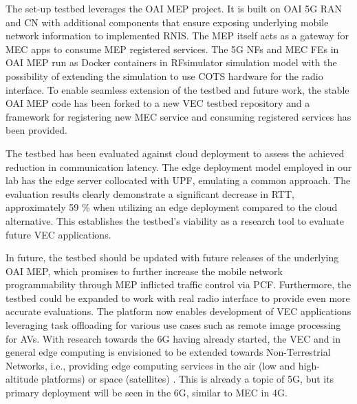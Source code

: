 \documentclass[12pt,a4paper,twoside]{report}
\begin{document}
The set-up testbed leverages the OAI MEP project. It is built on OAI 5G RAN and CN with additional components that ensure exposing underlying mobile network information to implemented RNIS. The MEP itself acts as a gateway for MEC apps to consume MEP registered services. The 5G NFs and MEC FEs in OAI MEP run as Docker containers in RFsimulator simulation model with the possibility of extending the simulation to use COTS hardware for the radio interface. To enable seamless extension of the testbed and future work, the stable OAI MEP code has been forked to a new VEC testbed repository and a framework for registering new MEC service and consuming registered services has been provided. 

The testbed has been evaluated against cloud deployment to assess the achieved reduction in communication latency. The edge deployment model employed in our lab has the edge server collocated with UPF, emulating a common approach. The evaluation results clearly demonstrate a significant decrease in RTT, approximately 59 \% when utilizing an edge deployment compared to the cloud alternative. This establishes the testbed’s viability as a research tool to evaluate future VEC applications. 

In future, the testbed should be updated with future releases of the underlying OAI MEP, which promises to further increase the mobile network programmability through MEP inflicted traffic control via PCF. Furthermore, the testbed could be expanded to work with real radio interface to provide even more accurate evaluations. The platform now enables development of VEC applications leveraging task offloading for various use cases such as remote image processing for AVs. With research towards the 6G having already started, the VEC and in general edge computing is envisioned to be extended towards Non-Terrestrial Networks, i.e., providing edge computing services in the air (low and high-altitude platforms) or space (satellites) \cite{araniti2021toward6G}. This is already a topic of 5G, but its primary deployment will be seen in the 6G, similar to MEC in 4G.





\clearpage

%
\end{document}
